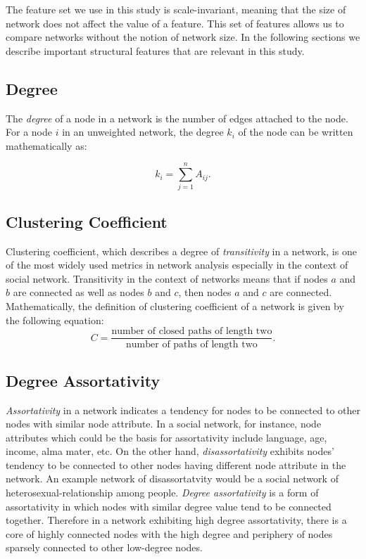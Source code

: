 	The feature set we use in this study is scale-invariant, meaning that the size of network does not affect the value of a feature. This set of features allows us to compare networks without the notion of network size. In the following sections we describe important structural features that are relevant in this study.	
	 
\subsection*{Degree}
	The \textit{degree} of a node in a network is the number of edges attached to the node. For a node $i$ in an unweighted network, the degree $k_i$ of the node can be written mathematically as:
	
	\begin{equation}
 	 k_i = \sum_{j = 1}^n A_{ij}.
	\end{equation}

	
\subsection*{Clustering Coefficient}
	Clustering coefficient, which describes a degree of \textit{transitivity} in a network, is one of the most widely used metrics in network analysis especially in the context of social network. Transitivity in the context of networks means that if nodes $a$ and $b$ are connected as well as nodes $b$ and $c$, then nodes $a$ and $c$ are connected. Mathematically, the definition of clustering coefficient of a network is given by the following equation:
	\begin{equation}
	C = \frac{\text{number of closed paths of length two}}{\text{number of paths of length two}}.
	\end{equation}
	

\subsection*{Degree Assortativity}
	\textit{Assortativity} in a network indicates a tendency for nodes to be connected to other nodes with similar node attribute. In a social network, for instance, node attributes which could be the basis for assortativity include language, age, income, alma mater, etc. On the other hand, \textit{disassortativity} exhibits nodes' tendency to be connected to other nodes having different node attribute in the network. An example network of disassortatvity would be a social network of heterosexual-relationship among people. 
	\textit{Degree assortativity} is a form of assortativity in which nodes with similar degree value tend to be connected together. Therefore in a network exhibiting high degree assortativity, there is a core of highly connected nodes with the high degree and periphery of nodes sparsely connected to other low-degree nodes.
	
